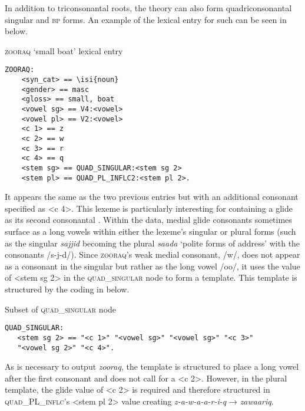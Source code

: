 \documentclass[output=paper,modfonts]{langscibook}
\begin{document}
In addition to triconsonantal roots, the theory can also form quadriconsonantal singular and \textsc{bp} forms. An example of the lexical entry for such can be seen in  below.

\newpage 
\ea \textsc{zooraq} ‘small boat’ lexical entry\\ \begin{lstlisting} 
ZOORAQ:
    <syn_cat> == \isi{noun}
    <gender> == masc
    <gloss> == small, boat
    <vowel sg> == V4:<vowel>
    <vowel pl> == V2:<vowel>
    <c 1> == z
    <c 2> == w
    <c 3> == r
    <c 4> == q
    <stem sg> == QUAD_SINGULAR:<stem sg 2>
    <stem pl> == QUAD_PL_INFLC2:<stem pl 2>.
\end{lstlisting}
\label{fig:winchester:10}
\z

It appears the same as the two previous entries but with an additional consonant specified as <c 4>. This lexeme is particularly interesting for containing a glide as its second consonantal . Within the data, medial glide  consonants sometimes surface as a long vowels within either the lexeme’s singular or plural forms (such as the singular \textit{sajjid} becoming the plural \textit{saada} ‘polite forms of address’ with the  consonants /s-j-d/). Since \textsc{zooraq}’s weak medial  consonant, /w/, does not appear as a consonant in the singular but rather as the long vowel /oo/, it uses the value of  <stem sg 2> in the \textsc{quad}\_\textsc{singular} node to form a template. This template is structured by the coding in  below.

\ea Subset of \textsc{quad}\_\textsc{singular} node\\ \begin{verbatim} 
QUAD_SINGULAR:
   <stem sg 2> == "<c 1>" "<vowel sg>" "<vowel sg>" "<c 3>" 
   "<vowel sg 2>" "<c 4>".
\end{verbatim}
\label{fig:winchester:11}
\z

As is necessary to output \textit{zooraq}, the template is structured to place a long vowel after the first  consonant and does not call for a <c 2>. However, in the plural template, the glide value of  <c 2> is required and therefore structured in \textsc{quad}\_PL\_\textsc{inflc}’s <stem pl 2> value creating \textit{z-a-w-a-a-r-i-q} → \textit{zawaariq}.
\end{document}
